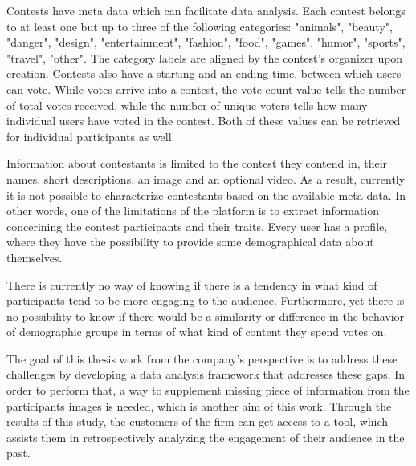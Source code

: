     Contests have meta data which can facilitate data analysis. Each contest belongs to at least one but up to three of the following categories: "animals", "beauty", "danger", "design", "entertainment", "fashion", "food", "games", "humor", "sports", "travel", "other". The category labels are aligned by the contest's organizer upon creation. Contests also have a starting and an ending time, between which users can vote. While votes arrive into a contest, the vote count value tells the number of total votes received, while the number of unique voters tells how many individual users have voted in the contest. Both of these values can be retrieved for individual participants as well. 

    Information about contestants is limited to the contest they contend in, their names, short descriptions, an image and an optional video. As a result, currently it is not possible to characterize contestants based on the available meta data. In other words, one of the limitations of the platform is to extract information concerining the contest participants and their traits. Every user has a profile, where they have the possibility to provide some demographical data about themselves.
    
    There is currently no way of knowing if there is a tendency in what kind of participants tend to be more engaging to the audience. Furthermore, yet there is no possibility to know if there would be a similarity or difference in the behavior of demographic groups in terms of what kind of content they spend votes on. 
    
    The goal of this thesis work from the company's perspective is to address these challenges by developing a data analysis framework that addresses these gaps. In order to perform that, a way to supplement missing piece of information from the participants images is needed, which is another aim of this work. Through the results of this study, the customers of the firm can get access to a tool, which assists them in retrospectively analyzing the engagement of their audience in the past.

